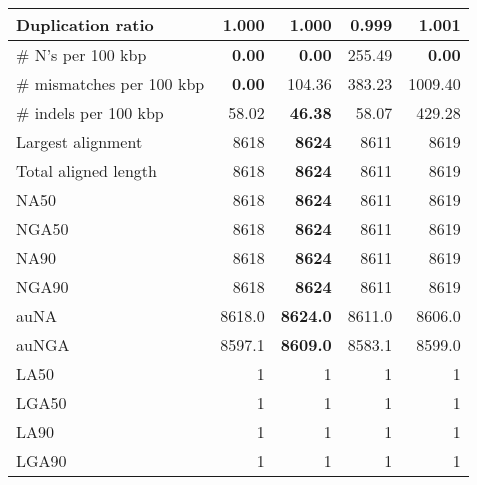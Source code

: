 \documentclass[12pt,a4paper]{article}
\begin{document}
\begin{table}[ht]
\begin{center}
\begin{tabular}{|l*{4}{|r}|}
Duplication ratio & 1.000 & 1.000 & {\bf 0.999} & 1.001 \\ \hline
\# N's per 100 kbp & {\bf 0.00} & {\bf 0.00} & 255.49 & {\bf 0.00} \\ \hline
\# mismatches per 100 kbp & {\bf 0.00} & 104.36 & 383.23 & 1009.40 \\ \hline
\# indels per 100 kbp & 58.02 & {\bf 46.38} & 58.07 & 429.28 \\ \hline
Largest alignment & 8618 & {\bf 8624} & 8611 & 8619 \\ \hline
Total aligned length & 8618 & {\bf 8624} & 8611 & 8619 \\ \hline
NA50 & 8618 & {\bf 8624} & 8611 & 8619 \\ \hline
NGA50 & 8618 & {\bf 8624} & 8611 & 8619 \\ \hline
NA90 & 8618 & {\bf 8624} & 8611 & 8619 \\ \hline
NGA90 & 8618 & {\bf 8624} & 8611 & 8619 \\ \hline
auNA & 8618.0 & {\bf 8624.0} & 8611.0 & 8606.0 \\ \hline
auNGA & 8597.1 & {\bf 8609.0} & 8583.1 & 8599.0 \\ \hline
LA50 & 1 & 1 & 1 & 1 \\ \hline
LGA50 & 1 & 1 & 1 & 1 \\ \hline
LA90 & 1 & 1 & 1 & 1 \\ \hline
LGA90 & 1 & 1 & 1 & 1 \\ \hline
\end{tabular}
\end{center}
\end{table}
\end{document}
